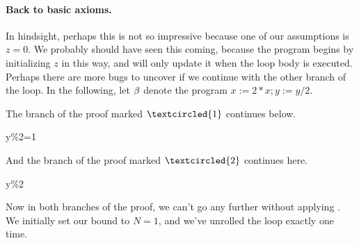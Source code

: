 \documentclass[11pt,twoside]{scrartcl}
\begin{document}
\paragraph{Back to basic axioms.}
In hindsight, perhaps this is not so impressive because one of our assumptions is $z=0$. We probably should have seen this coming, because the program begins by initializing $z$ in this way, and will only update it when the loop body is executed. Perhaps there are more bugs to uncover if we continue with the other branch of the loop. In the following, let $\beta$ denote the program $x:=2*x;y:=y/2$.
\begin{sequentdeduction}[array]
\small
{} {
   {} 
}
\end{sequentdeduction}
The branch of the proof marked $\textcircled{1}$ continues below.
\begin{sequentdeduction}
 {
   {y\%2=1 \limply {}\dibox{\bsprg}}
}
\end{sequentdeduction}
And the branch of the proof marked $\textcircled{2}$ continues here.
\begin{sequentdeduction}
 {
   {y\%2 \limply {}}
}
\end{sequentdeduction}
Now in both branches of the proof, we can't go any further without applying . We initially set our bound to $N=1$, and we've unrolled the loop exactly one time. 
\end{document}
